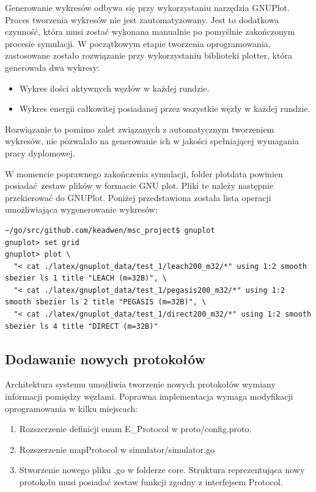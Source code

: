 \documentclass[a4paper,12pt,twoside,openany]{report}
\begin{document}
Generowanie wykresów odbywa się przy wykorzystaniu narzędzia GNUPlot. Proces tworzenia wykresów nie jest zautomatyzowany.
Jest to dodatkowa czynność, która musi zostać wykonana manualnie po pomyślnie zakończonym procesie symulacji.
W początkowym etapie tworzenia oprogramowania, zastosowane zostało rozwiązanie przy wykorzystaniu biblioteki plotter, która
generowała dwa wykresy:

\begin{itemize}
 \item Wykres ilości aktywnych węzłów w każdej rundzie. %
 \item Wykres energii całkowitej posiadanej przez wszystkie węzły w każdej rundzie.
\end{itemize}

Rozwiązanie to pomimo zalet związanych z automatycznym tworzeniem wykresów, nie pozwalało na generowanie ich w jakości spełniającej
wymagania pracy dyplomowej.

W momencie poprawnego zakończenia symulacji, folder plotdata powinien posiadać zestaw plików w formacie GNU plot.
Pliki te należy następnie przekierować do GNUPlot. Poniżej przedstawiona została lista operacji umożliwiająca wygenerowanie wykresów:

\begin{lstlisting}
~/go/src/github.com/keadwen/msc_project$ gnuplot
gnuplot> set grid
gnuplot> plot \
  "< cat ./latex/gnuplot_data/test_1/leach200_m32/*" using 1:2 smooth sbezier ls 1 title "LEACH (m=32B)", \
  "< cat ./latex/gnuplot_data/test_1/pegasis200_m32/*" using 1:2 smooth sbezier ls 2 title "PEGASIS (m=32B)", \
  "< cat ./latex/gnuplot_data/test_1/direct200_m32/*" using 1:2 smooth sbezier ls 4 title "DIRECT (m=32B)"
\end{lstlisting}

\subsection{Dodawanie nowych protokołów}

Architektura systemu umożliwia tworzenie nowych protokołów wymiany informacji pomiędzy węzłami.
Poprawna implementacja wymaga modyfikacji oprogramowania w kilku miejscach:

\begin{enumerate}
 \item Rozszerzenie definicji enum E\_Protocol w proto/config.proto.
 \item Rozszerzenie mapProtocol w simulator/simulator.go
 \item Stworzenie nowego pliku .go w folderze core. Struktura reprezentująca nowy protokołu musi posiadać zestaw funkcji zgodny z interfejsem Protocol.
\end{enumerate}
\end{document}
